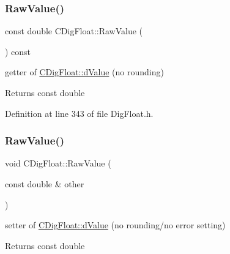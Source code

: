 \mbox{\label{classCDigFloat_ab6d3001a549d7496156321cbb26dde51}} 
\subsubsection{\texorpdfstring{Raw\+Value()}{RawValue()}\hspace{0.1cm}{\footnotesize\ttfamily [1/2]}}
{\footnotesize\ttfamily const double C\+Dig\+Float\+::\+Raw\+Value (\begin{DoxyParamCaption}{ }\end{DoxyParamCaption}) const\hspace{0.3cm}{\ttfamily [inline]}}



getter of \hyperlink{classCDigFloat_a4bbe69e30dd4e20527362493aa9aaf96}{C\+Dig\+Float\+::d\+Value} (no rounding) 

\begin{DoxyReturn}{Returns}
const double 
\end{DoxyReturn}


Definition at line 343 of file Dig\+Float.\+h.

\mbox{\label{classCDigFloat_a10dd39f19bfc21ae1d545d9203ef3e95}} 
\subsubsection{\texorpdfstring{Raw\+Value()}{RawValue()}\hspace{0.1cm}{\footnotesize\ttfamily [2/2]}}
{\footnotesize\ttfamily void C\+Dig\+Float\+::\+Raw\+Value (\begin{DoxyParamCaption}\item[{const double \&}]{other }\end{DoxyParamCaption})\hspace{0.3cm}{\ttfamily [inline]}}



setter of \hyperlink{classCDigFloat_a4bbe69e30dd4e20527362493aa9aaf96}{C\+Dig\+Float\+::d\+Value} (no rounding/no error setting) 

\begin{DoxyReturn}{Returns}
const double 
\end{DoxyReturn}


